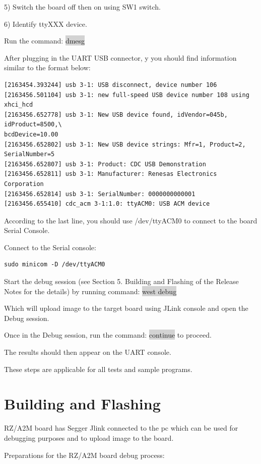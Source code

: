\documentclass[11pt,a4paper,oneside]{article}
\begin{document}
5) Switch the board off then on using SW1 switch.

6) Identify ttyXXX device.

Run the command: \colorbox{lightgray}{dmesg}

After plugging in the UART USB connector, y you should find information
similar to the format below:

\begin{lstlisting}
[2163454.393244] usb 3-1: USB disconnect, device number 106
[2163456.501104] usb 3-1: new full-speed USB device number 108 using xhci_hcd
[2163456.652778] usb 3-1: New USB device found, idVendor=045b, idProduct=8500,\
bcdDevice=10.00
[2163456.652802] usb 3-1: New USB device strings: Mfr=1, Product=2, SerialNumber=5
[2163456.652807] usb 3-1: Product: CDC USB Demonstration
[2163456.652811] usb 3-1: Manufacturer: Renesas Electronics Corporation
[2163456.652814] usb 3-1: SerialNumber: 0000000000001
[2163456.655410] cdc_acm 3-1:1.0: ttyACM0: USB ACM device
\end{lstlisting}

According to the last line, you should use /dev/ttyACM0 to connect to
the board Serial Console.

Connect to the Serial console:

\begin{lstlisting}
sudo minicom -D /dev/ttyACM0
\end{lstlisting}

Start the debug session (see Section 5. Building and Flashing of the
Release Notes for the details) by running command: \colorbox{lightgray}{west debug}

Which will upload image to the target board using JLink console and open
the Debug session.

Once in the Debug session, run the command: \colorbox{lightgray}{continue} to proceed.

The results should then appear on the UART console.

These steps are applicable for all tests and sample programs.

\section{Building and Flashing}\label{building-and-flashing}

RZ/A2M board has Segger Jlink connected to the pc which can be used for
debugging purposes and to upload image to the board.

Preparations for the RZ/A2M board debug process:
\end{document}
